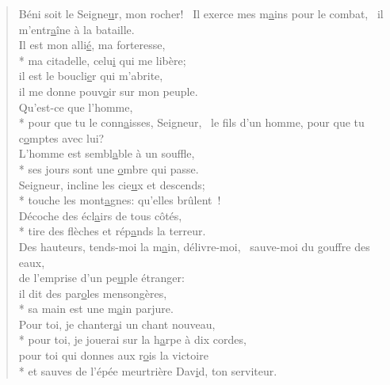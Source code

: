 
\begin{verse}
Béni soit le Seigne\underline{u}r, mon rocher!~\psalmdagger
Il exerce mes m\underline{a}ins pour le combat,~\psalmstar
il m’entr\underline{a}îne à la bataille. \\

Il est mon alli\underline{é}, ma forteresse, \\*
ma citadelle, celu\underline{i} qui me libère; \\
il est le boucli\underline{e}r qui m’abrite, \\
il me donne pouv\underline{o}ir sur mon peuple. \\

Qu’est-ce que l’homme, \\*
pour que tu le conn\underline{a}isses, Seigneur,~\psalmstar
le fils d’un homme, pour que tu c\underline{o}mptes avec lui? \\
L’homme est sembl\underline{a}ble à un souffle, \\*
ses jours sont une \underline{o}mbre qui passe. \\

Seigneur, incline les cie\underline{u}x et descends; \\*
touche les mont\underline{a}gnes: qu’elles brûlent ! \\
Décoche des écl\underline{a}irs de tous côtés, \\*
tire des flèches et rép\underline{a}nds la terreur. \\

Des hauteurs, tends-moi la m\underline{a}in, délivre-moi,~\psalmstar
sauve-moi du gouffre des eaux, \\
de l’emprise d’un pe\underline{u}ple étranger: \\
il dit des par\underline{o}les mensongères, \\*
sa main est une m\underline{a}in parjure. \\

Pour toi, je chanter\underline{a}i un chant nouveau, \\*
pour toi, je jouerai sur la h\underline{a}rpe à dix cordes, \\
pour toi qui donnes aux r\underline{o}is la victoire \\*
et sauves de l’épée meurtrière Dav\underline{i}d, ton serviteur. \\


\end{verse}
